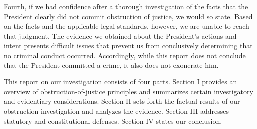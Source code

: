 Fourth, if we had confidence after a thorough investigation of the facts that the President clearly did not commit obstruction of justice, we would so state. 
Based on the facts and the applicable legal standards, however, we are unable to reach that judgment. 
The evidence we obtained about the President’s actions and intent presents difficult issues that prevent us from
conclusively determining that no criminal conduct occurred. 
Accordingly, while this report does not conclude that the President committed a crime, it also does not exonerate him.

\hr

This report on our investigation consists of four parts. 
Section I provides an overview of obstruction-of-justice principles and summarizes certain investigatory and evidentiary considerations. 
Section II sets forth the factual results of our obstruction investigation and analyzes the evidence. 
Section III addresses statutory and constitutional defenses. 
Section IV states our conclusion.

